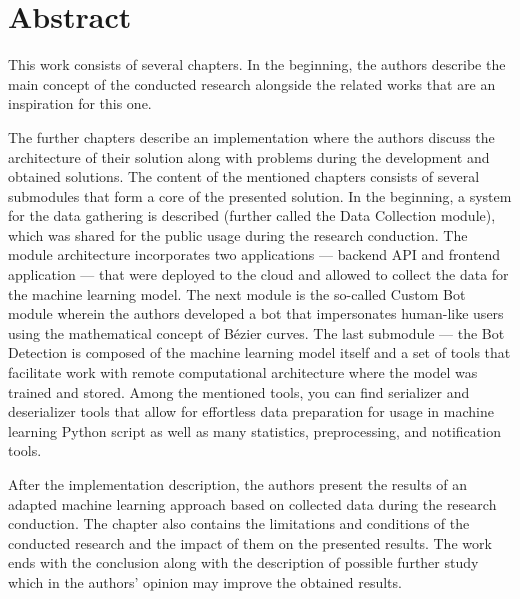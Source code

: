 \section{Abstract}\label{sec:abstract}
This work consists of several chapters.
In the beginning, the authors describe the main concept of the conducted research alongside the related works that are an inspiration for this one.

The further chapters describe an implementation where the authors discuss the architecture of their solution along with problems during the development and obtained solutions.
The content of the mentioned chapters consists of several submodules that form a core of the presented solution.
In the beginning, a system for the data gathering is described (further called the Data Collection module), which was shared for the public usage during the research conduction.
The module architecture incorporates two applications --- backend API and frontend application --- that were deployed to the cloud and allowed to collect the data for the machine learning model.
The next module is the so-called Custom Bot module wherein the authors developed a bot that impersonates human-like users using the mathematical concept of Bézier curves.
The last submodule --- the Bot Detection is composed of the machine learning model itself and a set of tools that facilitate work with remote computational architecture where the model was trained and stored.
Among the mentioned tools, you can find serializer and deserializer tools that allow for effortless data preparation for usage in machine learning Python script as well as many statistics, preprocessing, and notification tools.

After the implementation description, the authors present the results of an adapted machine learning approach based on collected data during the research conduction.
The chapter also contains the limitations and conditions of the conducted research and the impact of them on the presented results.
The work ends with the conclusion along with the description of possible further study which in the authors' opinion may improve the obtained results.